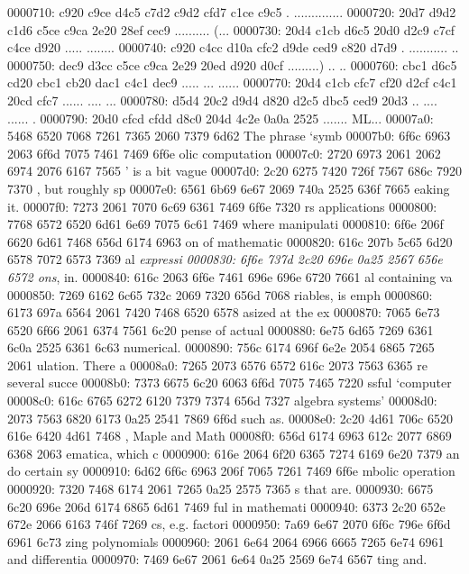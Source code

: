 0000710: c920 c9ce d4c5 c7d2 c9d2 cfd7 c1ce c9c5  . ..............
0000720: 20d7 d9d2 c1d6 c5ce c9ca 2e20 28ef cec9   .......... (...
0000730: 20d4 c1cb d6c5 20d0 d2c9 c7cf c4ce d920   ..... ........ 
0000740: c920 c4cc d10a cfc2 d9de ced9 c820 d7d9  . ........... ..
0000750: dec9 d3cc c5ce c9ca 2e29 20ed d920 d0cf  .........) .. ..
0000760: cbc1 d6c5 cd20 cbc1 cb20 dac1 c4c1 dec9  ..... ... ......
0000770: 20d4 c1cb cfc7 cf20 d2cf c4c1 20cd cfc7   ...... .... ...
0000780: d5d4 20c2 d9d4 d820 d2c5 dbc5 ced9 20d3  .. .... ...... .
0000790: 20d0 cfcd cfdd d8c0 204d 4c2e 0a0a 2525   ....... ML...%
00007a0: 5468 6520 7068 7261 7365 2060 7379 6d62  The phrase `symb
00007b0: 6f6c 6963 2063 6f6d 7075 7461 7469 6f6e  olic computation
00007c0: 2720 6973 2061 2062 6974 2076 6167 7565  ' is a bit vague
00007d0: 2c20 6275 7420 726f 7567 686c 7920 7370  , but roughly sp
00007e0: 6561 6b69 6e67 2069 740a 2525 636f 7665  eaking it.%
00007f0: 7273 2061 7070 6c69 6361 7469 6f6e 7320  rs applications 
0000800: 7768 6572 6520 6d61 6e69 7075 6c61 7469  where manipulati
0000810: 6f6e 206f 6620 6d61 7468 656d 6174 6963  on of mathematic
0000820: 616c 207b 5c65 6d20 6578 7072 6573 7369  al {\em expressi
0000830: 6f6e 737d 2c20 696e 0a25 2567 656e 6572  ons}, in.%
0000840: 616c 2063 6f6e 7461 696e 696e 6720 7661  al containing va
0000850: 7269 6162 6c65 732c 2069 7320 656d 7068  riables, is emph
0000860: 6173 697a 6564 2061 7420 7468 6520 6578  asized at the ex
0000870: 7065 6e73 6520 6f66 2061 6374 7561 6c20  pense of actual 
0000880: 6e75 6d65 7269 6361 6c0a 2525 6361 6c63  numerical.%
0000890: 756c 6174 696f 6e2e 2054 6865 7265 2061  ulation. There a
00008a0: 7265 2073 6576 6572 616c 2073 7563 6365  re several succe
00008b0: 7373 6675 6c20 6063 6f6d 7075 7465 7220  ssful `computer 
00008c0: 616c 6765 6272 6120 7379 7374 656d 7327  algebra systems'
00008d0: 2073 7563 6820 6173 0a25 2541 7869 6f6d   such as.%
00008e0: 2c20 4d61 706c 6520 616e 6420 4d61 7468  , Maple and Math
00008f0: 656d 6174 6963 612c 2077 6869 6368 2063  ematica, which c
0000900: 616e 2064 6f20 6365 7274 6169 6e20 7379  an do certain sy
0000910: 6d62 6f6c 6963 206f 7065 7261 7469 6f6e  mbolic operation
0000920: 7320 7468 6174 2061 7265 0a25 2575 7365  s that are.%
0000930: 6675 6c20 696e 206d 6174 6865 6d61 7469  ful in mathemati
0000940: 6373 2c20 652e 672e 2066 6163 746f 7269  cs, e.g. factori
0000950: 7a69 6e67 2070 6f6c 796e 6f6d 6961 6c73  zing polynomials
0000960: 2061 6e64 2064 6966 6665 7265 6e74 6961   and differentia
0000970: 7469 6e67 2061 6e64 0a25 2569 6e74 6567  ting and.%
